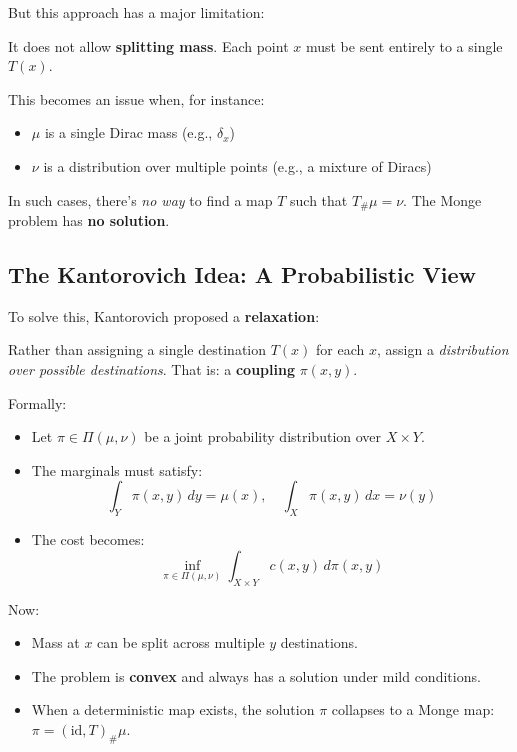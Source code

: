 \documentclass[11pt]{article}
\begin{document}
But this approach has a major limitation:

\begin{highlight}
It does not allow \textbf{splitting mass}. Each point $x$ must be sent entirely to a single $T(x)$.
\end{highlight}

This becomes an issue when, for instance:
\begin{itemize}
  \item $\mu$ is a single Dirac mass (e.g., $\delta_x$)
  \item $\nu$ is a distribution over multiple points (e.g., a mixture of Diracs)
\end{itemize}

In such cases, there's \emph{no way} to find a map $T$ such that $T_\#\mu = \nu$. The Monge problem has \textbf{no solution}.

\subsection*{The Kantorovich Idea: A Probabilistic View}
To solve this, Kantorovich proposed a \textbf{relaxation}:

\begin{highlight}
Rather than assigning a single destination $T(x)$ for each $x$, assign a \emph{distribution over possible destinations}. That is: a \textbf{coupling} $\pi(x, y)$.
\end{highlight}

Formally:
\begin{itemize}
  \item Let $\pi \in \Pi(\mu, \nu)$ be a joint probability distribution over $X \times Y$.
  \item The marginals must satisfy:
  \[
  \int_Y \pi(x, y)\,dy = \mu(x), \quad \int_X \pi(x, y)\,dx = \nu(y)
  \]
  \item The cost becomes:
  \[
  \inf_{\pi \in \Pi(\mu, \nu)} \int_{X \times Y} c(x, y)\, d\pi(x, y)
  \]
\end{itemize}

Now:
\begin{itemize}
  \item Mass at $x$ can be split across multiple $y$ destinations.
  \item The problem is \textbf{convex} and always has a solution under mild conditions.
  \item When a deterministic map exists, the solution $\pi$ collapses to a Monge map: $\pi = (\text{id}, T)_\#\mu$.
\end{itemize}
\end{document}
